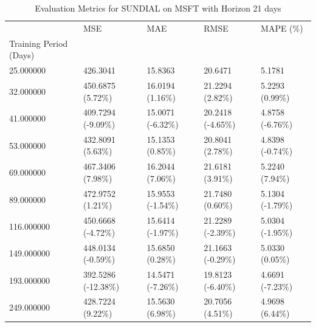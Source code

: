 \begin{table}
\caption{Evaluation Metrics for SUNDIAL on MSFT with Horizon 21 days}
\label{tab:sundial_MSFT_h21_metrics}
\begin{tabular}{lllll}
\toprule
 & MSE & MAE & RMSE & MAPE (\%) \\
Training Period (Days) &  &  &  &  \\
\midrule
25.000000 & 426.3041 & 15.8363 & 20.6471 & 5.1781 \\
32.000000 & 450.6875 (5.72\%) & 16.0194 (1.16\%) & 21.2294 (2.82\%) & 5.2293 (0.99\%) \\
41.000000 & 409.7294 (-9.09\%) & 15.0071 (-6.32\%) & 20.2418 (-4.65\%) & 4.8758 (-6.76\%) \\
53.000000 & 432.8091 (5.63\%) & 15.1353 (0.85\%) & 20.8041 (2.78\%) & 4.8398 (-0.74\%) \\
69.000000 & 467.3406 (7.98\%) & 16.2044 (7.06\%) & 21.6181 (3.91\%) & 5.2240 (7.94\%) \\
89.000000 & 472.9752 (1.21\%) & 15.9553 (-1.54\%) & 21.7480 (0.60\%) & 5.1304 (-1.79\%) \\
116.000000 & 450.6668 (-4.72\%) & 15.6414 (-1.97\%) & 21.2289 (-2.39\%) & 5.0304 (-1.95\%) \\
149.000000 & 448.0134 (-0.59\%) & 15.6850 (0.28\%) & 21.1663 (-0.29\%) & 5.0330 (0.05\%) \\
193.000000 & 392.5286 (-12.38\%) & 14.5471 (-7.26\%) & 19.8123 (-6.40\%) & 4.6691 (-7.23\%) \\
249.000000 & 428.7224 (9.22\%) & 15.5630 (6.98\%) & 20.7056 (4.51\%) & 4.9698 (6.44\%) \\
\bottomrule
\end{tabular}
\end{table}
